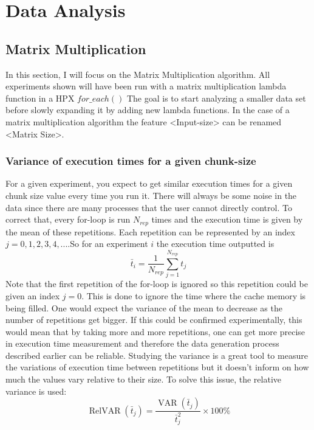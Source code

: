 \section{Data Analysis}

\subsection{Matrix Multiplication}
In this section, I will focus on the Matrix Multiplication algorithm. All experiments shown will have been run with a matrix multiplication lambda function in a HPX $for\_each()$ The goal is to start analyzing a smaller data set before slowly expanding it by adding new lambda functions. In the case of a matrix multiplication algorithm the feature <Input-size> can be renamed <Matrix Size>.

\subsubsection{Variance of execution times for a given chunk-size}
For a given experiment, you expect to get similar execution times for a given chunk size value every time you run it. There will always be some noise in the data since there are many processes that the user cannot directly control. To correct that, every for-loop is run $N_{rep}$ times and the execution time is given by the mean of these repetitions. Each repetition can be represented by an index $j=0,1,2,3,4,...$.So for an experiment $i$ the execution time outputted is 
$$\bar{t}_i=\frac{1}{N_{rep}}\sum_{j=1}^{N_{rep}}t_j$$
Note that the first repetition of the for-loop is ignored so this repetition could be given an index $j=0$. This is done to ignore the time where the cache memory is being filled.
One would expect the variance of the mean
to decrease as the number of repetitions get bigger. If this could be confirmed experimentally, this would mean that by taking more and more repetitions, one can get more precise in execution time measurement and therefore the data generation process described earlier can be reliable. Studying the variance is a great tool to measure the variations of execution time between repetitions but it doesn't inform on how much the values vary relative to their size. To solve this issue, the relative variance is used:
$$\operatorname{RelVAR}(\bar{t}_j)=\frac{\operatorname{VAR}(\bar{t}_j)}{\bar{t}_j^2}\times 100 \%$$

